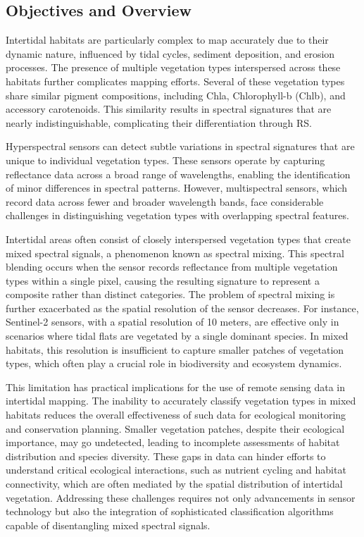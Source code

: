 \documentclass[
  letterpaper,
  11pt,
  english,
  singlespacing,
  headsepline]{MastersDoctoralThesis}
\begin{document}
\begin{spacing}{1.5}
\section{Objectives and Overview}\label{objectives-and-overview}

Intertidal habitats are particularly complex to map accurately due to
their dynamic nature, influenced by tidal cycles, sediment deposition,
and erosion processes. The presence of multiple vegetation types
interspersed across these habitats further complicates mapping efforts.
Several of these vegetation types share similar pigment compositions,
including Chla, Chlorophyll-b (Chlb), and accessory carotenoids. This
similarity results in spectral signatures that are nearly
indistinguishable, complicating their differentiation through RS.

Hyperspectral sensors can detect subtle variations in spectral
signatures that are unique to individual vegetation types. These sensors
operate by capturing reflectance data across a broad range of
wavelengths, enabling the identification of minor differences in
spectral patterns. However, multispectral sensors, which record data
across fewer and broader wavelength bands, face considerable challenges
in distinguishing vegetation types with overlapping spectral features.

Intertidal areas often consist of closely interspersed vegetation types
that create mixed spectral signals, a phenomenon known as spectral
mixing. This spectral blending occurs when the sensor records
reflectance from multiple vegetation types within a single pixel,
causing the resulting signature to represent a composite rather than
distinct categories. The problem of spectral mixing is further
exacerbated as the spatial resolution of the sensor decreases. For
instance, Sentinel-2 sensors, with a spatial resolution of 10 meters,
are effective only in scenarios where tidal flats are vegetated by a
single dominant species. In mixed habitats, this resolution is
insufficient to capture smaller patches of vegetation types, which often
play a crucial role in biodiversity and ecosystem dynamics.

This limitation has practical implications for the use of remote sensing
data in intertidal mapping. The inability to accurately classify
vegetation types in mixed habitats reduces the overall effectiveness of
such data for ecological monitoring and conservation planning. Smaller
vegetation patches, despite their ecological importance, may go
undetected, leading to incomplete assessments of habitat distribution
and species diversity. These gaps in data can hinder efforts to
understand critical ecological interactions, such as nutrient cycling
and habitat connectivity, which are often mediated by the spatial
distribution of intertidal vegetation. Addressing these challenges
requires not only advancements in sensor technology but also the
integration of sophisticated classification algorithms capable of
disentangling mixed spectral signals.


\end{spacing}
\end{document}
